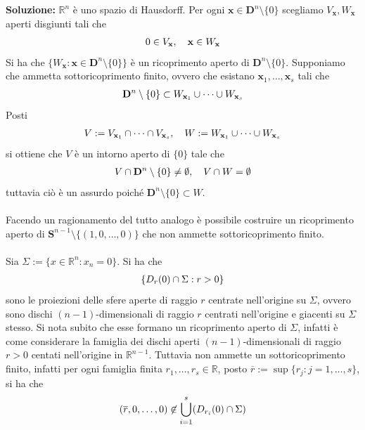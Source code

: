 \documentclass{article}
\begin{document}
\textbf{Soluzione:} $\mathbb{R}^n$ è uno spazio di Hausdorff. Per ogni $\mathbf{x} \in \mathbf{D}^n \setminus \{ 0 \}$ scegliamo $V_\mathbf{x}, W_\mathbf{x}$ aperti disgiunti tali che
\begin{gather}
    0 \in V_\mathbf{x}, \quad \mathbf{x} \in W_\mathbf{x} \notag
\end{gather}
Si ha che $\{ W_\mathbf{x} : \mathbf{x} \in \mathbf{D}^n \setminus \{ 0 \} \}$ è un ricoprimento aperto di $\mathbf{D}^n \setminus \{ 0 \}$. Supponiamo che ammetta sottoricoprimento finito, ovvero che esistano $\mathbf{x}_1, \dots, \mathbf{x}_s$ tali che
\begin{gather}
    \mathbf{D}^n \setminus \{ 0 \} \subset W_{\mathbf{x}_1} \cup \dots \cup W_{\mathbf{x}_s} \notag
\end{gather}
Posti
\begin{gather}
    V := V_{\mathbf{x}_1} \cap \dots \cap V_{\mathbf{x}_s}, \quad W := W_{\mathbf{x}_1} \cup \dots \cup W_{\mathbf{x}_s} \notag
\end{gather}
si ottiene che $V$ è un intorno aperto di $\{ 0 \}$ tale che
\begin{gather}
    V \cap \mathbf{D}^n \setminus \{ 0 \} \neq \emptyset, \quad V \cap W = \emptyset \notag
\end{gather}
tuttavia ciò è un assurdo poiché $\mathbf{D}^n \setminus \{ 0 \} \subset W$. \\ \\
Facendo un ragionamento del tutto analogo è possibile costruire un ricoprimento aperto di $\mathbf{S}^{n - 1} \setminus \{ (1, 0, \dots, 0) \}$ che non ammette sottoricoprimento finito. \\ \\
Sia $\Sigma := \{ x \in \mathbb{R}^n : x_n = 0 \}$. Si ha che
\begin{gather}
    \{ D_r(0) \cap \Sigma : r > 0 \} \notag
\end{gather}
sono le proiezioni delle sfere aperte di raggio $r$ centrate nell'origine su $\Sigma$, ovvero sono dischi $(n - 1)$-dimensionali di raggio $r$ centrati nell'origine e giacenti su $\Sigma$ stesso. Si nota subito che esse formano un ricoprimento aperto di $\Sigma$, infatti è come considerare la famiglia dei dischi aperti $(n - 1)$-dimensionali di raggio $r > 0$ centati nell'origine in $\mathbb{R}^{n - 1}$. Tuttavia non ammette un sottoricoprimento finito, infatti per ogni famiglia finita $r_1, \dots, r_s \in \mathbb{R}$, posto $\overline{r} := \sup \{ r_j : j = 1, \dots, s \}$, si ha che
\begin{gather}
    (\overline{r}, 0, \dots, 0) \not\in \bigcup_{i = 1}^s (D_{r_i}(0) \cap \Sigma) \notag
\end{gather}
\end{document}
